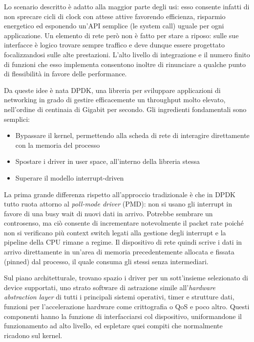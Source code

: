 Lo scenario descritto è adatto alla maggior parte degli usi: esso consente infatti di non sprecare cicli di clock con attese attive favorendo efficienza, risparmio energetico ed esponendo un'API semplice (le system call) uguale per ogni applicazione. Un elemento di rete però non è fatto per stare a riposo: sulle sue interfacce è logico trovare sempre traffico e deve dunque essere progettato focalizzandosi sulle alte prestazioni. L'alto livello di integrazione e il numero finito di funzioni che esso implementa consentono inoltre di rinunciare a qualche punto di flessibilità in favore delle performance.

Da queste idee è nata DPDK, una libreria per sviluppare applicazioni di networking in grado di gestire efficacemente un throughput molto elevato, nell'ordine di centinaia di Gigabit per secondo. Gli ingredienti fondamentali sono semplici:

\begin{itemize}
    \item Bypassare il kernel, permettendo alla scheda di rete di interagire direttamente con la memoria del processo
    \item Spostare i driver in user space, all'interno della libreria stessa
    \item Superare il modello interrupt-driven
\end{itemize}

La prima grande differenza rispetto all'approccio tradizionale è che in DPDK tutto ruota attorno al \textit{poll-mode driver} (PMD): non si usano gli interrupt in favore di una busy wait di nuovi dati in arrivo. Potrebbe sembrare un controsenso, ma ciò consente di incrementare notevolmente il packet rate poiché non si verificano più context switch legati alla gestione degli interrupt e la pipeline della CPU rimane a regime. Il dispositivo di rete quindi scrive i dati in arrivo direttamente in un'area di memoria precedentemente allocata e fissata (pinned) dal processo, il quale consuma gli stessi senza intermediari. 

Sul piano architetturale, trovano spazio i driver per un sott'insieme selezionato di device supportati, uno strato software di astrazione simile all'\textit{hardware abstraction layer} di tutti i principali sistemi operativi, timer e strutture dati, funzioni per l'accelerazione hardware come crittografia o QoS e poco altro. Questi componenti hanno la funzione di interfacciarsi col dispositivo, uniformandone il funzionamento ad alto livello, ed espletare quei compiti che normalmente ricadono sul kernel.

